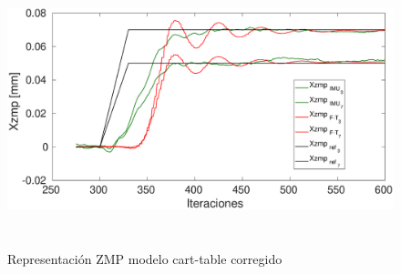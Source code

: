 \begin{figure}[H]
\centering
\includegraphics[width=13cm, height=8cm]{imagenes/apartado_5/test_allcsv4_2}
\caption{Representación ZMP modelo cart-table corregido}
\label{figura516}
\end{figure}



\afterpage{\null\newpage}
\newpage
